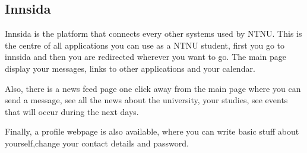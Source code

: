 \subsection{Innsida}

Innsida is the platform that connects every other systems used by NTNU. This is the centre of all applications you can use as a NTNU student, first you go to innsida and then you are redirected wherever you want to go. The main page display your messages, links to other applications and your calendar. 
\par
Also, there is a news feed page one click away from the main page where you can send a message, see all the news about the university, your studies, see events that will occur during the next days. 
\par
Finally, a profile webpage is also available, where you can write basic stuff about yourself,change your contact details and password.